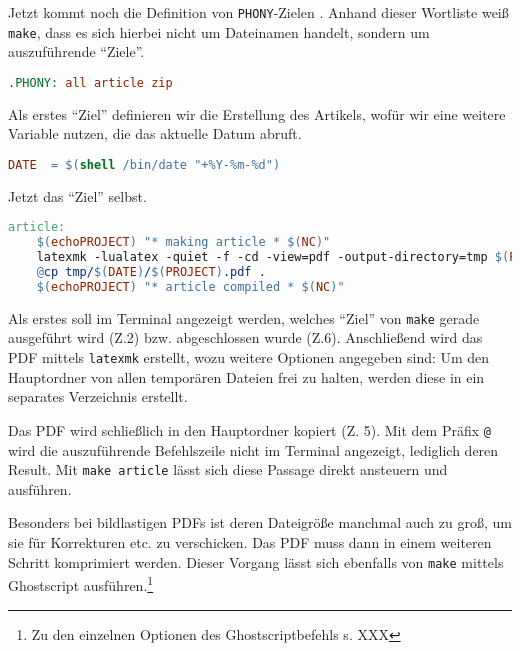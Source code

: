 \documentclass[ngerman]{dtk}
\begin{document}
Jetzt kommt noch die Definition von \texttt{PHONY}-Zielen \parencite[13--15]{gnu-make}.
Anhand dieser Wortliste weiß \texttt{make},
dass es sich hierbei nicht um Dateinamen handelt,
sondern um auszuführende \enquote{Ziele}.
\begin{lstlisting}[style=number,language=make]
.PHONY: all article zip
\end{lstlisting}


Als erstes \enquote{Ziel} definieren wir die Erstellung des Artikels,
wofür wir eine weitere Variable nutzen, die das aktuelle Datum abruft.
\begin{lstlisting}[style=number,language=make]
DATE  = $(shell /bin/date "+%Y-%m-%d")
\end{lstlisting}

Jetzt das \enquote{Ziel} selbst.
\begin{lstlisting}[style=number,language=make]
article:
	$(echoPROJECT) "* making article * $(NC)"
	latexmk -lualatex -quiet -f -cd -view=pdf -output-directory=tmp $(PROJECT).tex
	@cp tmp/$(DATE)/$(PROJECT).pdf .
	$(echoPROJECT) "* article compiled * $(NC)"
\end{lstlisting}
Als erstes soll im Terminal angezeigt werden, welches \enquote{Ziel}
von \texttt{make} gerade ausgeführt  wird (Z.2) bzw. abgeschlossen wurde (Z.6).
Anschließend wird das PDF mittels \texttt{latexmk} erstellt, wozu weitere Optionen angegeben sind:
Um den Hauptordner von allen temporären Dateien frei zu halten,
werden diese in ein separates Verzeichnis erstellt.

Das PDF wird schließlich in den Hauptordner kopiert (Z. 5).
Mit dem Präfix \texttt{@} wird die auszuführende Befehlszeile nicht
im Terminal angezeigt, lediglich deren Result.
Mit \texttt{make article} lässt sich diese Passage direkt ansteuern und ausführen.

Besonders bei bildlastigen PDFs ist deren Dateigröße manchmal auch zu groß,
um sie für Korrekturen etc. zu verschicken.
Das PDF muss dann in einem weiteren Schritt komprimiert werden.
Dieser Vorgang lässt sich ebenfalls von \texttt{make} mittels Ghostscript ausführen.\footnote{Zu den einzelnen Optionen des Ghostscriptbefehls s. XXX}
\end{document}
